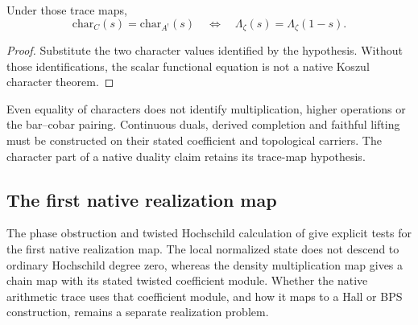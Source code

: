 \begin{proposition}
\label{v4-arith:prim-zeta:fingerprint}
\label{v4-arith:prim-zeta:prop:char-functional-eq}
Under those trace maps,
\begin{equation}
 \mathrm{char}_{C}(s)=\mathrm{char}_{A^!}(s)
 \quad\Longleftrightarrow\quad
 \Lambda_\zeta(s)=\Lambda_\zeta(1-s).
 \label{v4-arith:prim-zeta:eq:char-functional-eq}
\end{equation}
\end{proposition}
\begin{proof}
Substitute the two character values identified by the hypothesis.
Without those identifications, the scalar functional equation is not a
native Koszul character theorem.
\end{proof}

\begin{remark}
\label{v4-arith:prim-zeta:disjoint-sources}
\label{v4-arith:prim-zeta:rem:sources}
\label{v4-arith:prim-zeta:rem:sources-disjoint}
\label{v4-arith:prim-zeta:rem:p1-form}
\label{v4-arith:prim-zeta:rem:caveat-fingerprint}
Even equality of characters does not identify multiplication, higher
operations or the bar--cobar pairing. Continuous duals, derived
completion and faithful lifting must be constructed on their stated
coefficient and topological carriers. The character part of a native
duality claim retains its trace-map hypothesis.
\end{remark}

\subsection{The first native realization map}
\label{v4-arith:prim-zeta:remaining-four}
\label{v4-arith:prim-zeta:residual-table}
\label{v4-arith:prim-zeta:tab:residual}
\label{v4-arith:prim-zeta:summary}
The phase obstruction and twisted Hochschild calculation of
 give explicit tests for the first native
realization map. The local normalized state does not descend to ordinary
Hochschild degree zero, whereas the density multiplication map gives a
chain map with its stated twisted coefficient module. Whether the
native arithmetic trace uses that coefficient module, and how it maps
to a Hall or BPS construction, remains a separate realization problem.
